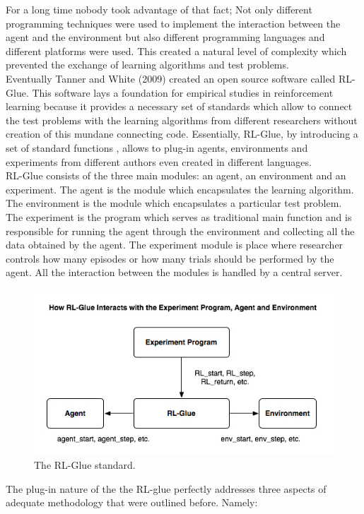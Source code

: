 For a long time nobody took advantage of that fact; Not only different programming techniques were used to implement the interaction between the agent and the environment but also different programming languages and different platforms were used. This created a natural level of complexity which prevented the exchange of learning algorithms and test problems. \\

Eventually Tanner and White (2009)\cite{tanner2009rl} created an open source software called RL-Glue. This software lays a foundation for empirical studies in reinforcement learning because it provides a necessary set of standards which allow to connect the test problems with the learning algorithms from different researchers without creation of this mundane connecting code. Essentially, RL-Glue, by introducing a set of standard functions , allows to plug-in agents, environments and experiments from different authors even created in different languages. \\

RL-Glue consists of the three main modules: an agent, an environment and an experiment. The agent is the module which encapsulates the learning algorithm. The environment is the module which encapsulates a particular test problem. The experiment is the program which serves as traditional main function and is responsible for running the agent through the environment and collecting all the data obtained by the agent. The experiment module is place where researcher controls how many episodes or how many trials should be performed by the agent. All the interaction between the modules is handled by a central server. \\
\begin{figure}[ht]
\vskip 0.2in
\centering
\includegraphics[scale=0.9]{glue.png}
\caption{The RL-Glue standard.}
\vskip -0.2in
\label{rlglue}
\end{figure}
The plug-in nature of the the RL-glue perfectly addresses three aspects of adequate methodology that were outlined before. Namely:

